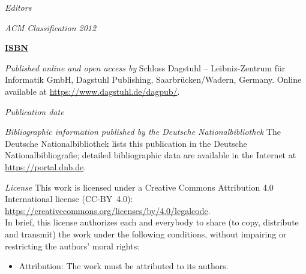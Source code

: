 \documentclass[a4paper,UKenglish]{lipicsmaster-v2021}
\begin{document}
\frontmatter


\maketitle


\begin{publicationinfo}%
\sffamily

\emph{Editors} 
\printEditorLong


\bigskip
\bigskip
\emph{ACM Classification 2012}\\
\printSubjclass

\bigskip
\bigskip

{\Large\bfseries\sffamily \href{https://www.dagstuhl.de/dagpub/\printISBN}{ISBN \printISBN}}

\bigskip
\bigskip

\emph{Published online and open access by}\newline
Schloss Dagstuhl -- Leibniz-Zentrum f\"ur Informatik GmbH, Dagstuhl Publishing, Saarbr\"ucken/Wadern, Germany. Online available at \href{https://www.dagstuhl.de/dagpub/\printISBN}{https://www.dagstuhl.de/dagpub/\printISBN}.

\bigskip
\emph{Publication date}\newline
\printDatePublished

\bigskip
\bigskip

\emph{Bibliographic information published by the Deutsche Nationalbibliothek}\newline
The Deutsche Nationalbibliothek lists this publication in the Deutsche Nationalbibliografie; detailed bibliographic data are available in the Internet at \href{https://portal.dnb.de}{https://portal.dnb.de}. 

\bigskip

\emph{License}\newline
This work is licensed under a Creative Commons Attribution 4.0 International license (CC-BY~4.0):\\ \href{https://creativecommons.org/licenses/by/4.0/legalcode}{https://creativecommons.org/licenses/by/4.0/legalcode}.\\
In brief, this license authorizes each and everybody to share (to copy, distribute and transmit) the work under the following conditions, without impairing or restricting the authors' moral rights:
\begin{itemize}
\item Attribution: The work must be attributed to its authors.
\end{itemize}


\end{publicationinfo}
\end{document}
